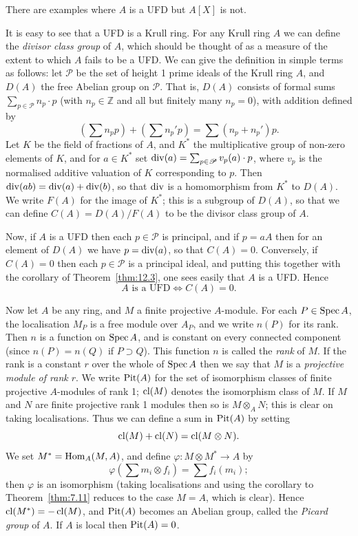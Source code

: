 \begin{remark}
There are examples where $A$ is a UFD but $A[X]$ is not.
\end{remark}

It is easy to see that a UFD is a Krull ring. For any Krull ring $A$ we
can define the \emph{divisor class group} of $A$, which should be thought of as a
measure of the extent to which $A$ fails to be a UFD. We can give the
definition in simple terms as follows: let $\mathscr{P}$ be the set of height 1 prime
ideals of the Krull ring $A$, and $D(A)$ the free Abelian group on $\mathscr{P}$. That
is, $D(A)$ consists of formal sums $\sum_{p \in \mathscr{P}} n_p \cdot p$ (with $n_p \in \mathbb{Z}$ and all but finitely
many $n_p = 0$), with addition defined by
\[
  \left(\sum n_pp\right) + \left(\sum n_p'p\right) = \sum (n_p + n_p')p.
\]
Let $K$ be the field of fractions of $A$, and $K^*$ the multiplicative group of
non-zero elements of $K$, and for $a \in K^*$ set $\operatorname{div}(a) = \sum_{p \in \mathscr{P}} v_p(a) \cdot p$, where $v_p$
is the normalised additive valuation of $K$ corresponding to $p$. Then
$\operatorname{div}(ab) = \operatorname{div}(a) + \operatorname{div}(b)$, so that $\operatorname{div}$ is a homomorphism from $K^*$ to $D(A)$. We
write $F(A)$ for the image of $K^*$; this is a subgroup of $D(A)$, so that
we can define $C(A) = D(A)/F(A)$ to be the divisor class group of $A$.

Now, if $A$ is a UFD then each $p \in \mathscr{P}$ is principal, and if $p = aA$ then for
an element of $D(A)$ we have $p = \operatorname{div}(a)$, so that $C(A) = 0$. Conversely, if
$C(A) = 0$ then each $p \in \mathscr{P}$ is a principal ideal, and putting this together
with the corollary of Theorem~\ref{thm:12.3}, one sees easily that $A$ is a UFD. Hence
\[
  A \text{ is a UFD} \iff C(A) = 0.
\]

Now let $A$ be any ring, and $M$ a finite projective $A$-module. For each
$P \in \operatorname{Spec} A$, the localisation $M_P$ is a free module over $A_P$, and we write
$n(P)$ for its rank. Then $n$ is a function on $\operatorname{Spec} A$, and is constant on every
connected component (since $n(P) = n(Q)$ if $P \supset Q$). This function $n$ is called
the \emph{rank} of $M$. If the rank is a constant $r$ over the whole of $\operatorname{Spec} A$ then
we say that $M$ is a \emph{projective module of rank $r$}. We write $\operatorname{Pit}(A)$ for the
set of isomorphism classes of finite projective $A$-modules of rank 1; $\operatorname{cl}(M)$
denotes the isomorphism class of $M$. If $M$ and $N$ are finite projective rank
1 modules then so is $M \otimes_A N$; this is clear on taking localisations. Thus
we can define a sum in $\operatorname{Pit}(A)$ by setting
\[
  \operatorname{cl}(M) + \operatorname{cl}(N) = \operatorname{cl}(M \otimes N).
\]
We set $M^* = \operatorname{Hom}_A(M, A)$, and define $\varphi\colon M \otimes M^* \to A$ by
\[
  \varphi\left(\sum m_i \otimes f_i\right) = \sum f_i(m_i);
\]
then $\varphi$ is an isomorphism (taking localisations and using the corollary to
Theorem~\ref{thm:7.11} reduces to the case $M = A$, which is clear). Hence $\operatorname{cl}(M^*) =
-\operatorname{cl}(M)$, and $\operatorname{Pit}(A)$ becomes an Abelian group, called the \emph{Picard group}
of $A$. If $A$ is local then $\operatorname{Pit}(A) = 0$.

